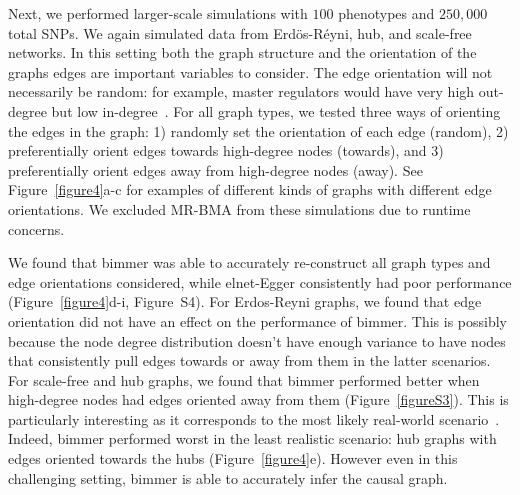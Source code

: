 \documentclass{article}
\begin{document}
Next, we performed larger-scale simulations with $100$ phenotypes and
$250,000$ total SNPs. We again
simulated data from Erd\"os-R\'eyni, hub, and scale-free networks. In this setting
both the graph structure and the orientation of the graphs edges are important
variables to consider. The edge orientation will not necessarily be random:
for example, master regulators would have very high out-degree but low in-degree~\cite{Liu2010}.
For all graph types, we tested three ways of orienting the edges in the graph:
 1) randomly set the orientation
of each edge (random), 2) preferentially orient edges towards high-degree nodes (towards),
 and 3) preferentially orient edges away from high-degree nodes (away). See
 Figure~\ref{figure4}a-c for examples of different kinds of graphs with
 different edge orientations. We excluded
MR-BMA from these simulations due to runtime concerns.

We found that bimmer was able to accurately re-construct all graph types and edge
orientations considered, while
elnet-Egger consistently had poor performance (Figure~\ref{figure4}d-i, Figure~S4).
 For Erdos-Reyni graphs, we found that edge orientation did not have an effect on the
 performance of bimmer. This is possibly because the node degree distribution
 doesn't have enough variance to have nodes that consistently pull edges towards
 or away from them in the latter scenarios. For scale-free and hub graphs, we
 found that bimmer performed better when high-degree nodes had edges oriented
 away from them (Figure~\ref{figureS3}). This is particularly interesting as
 it corresponds to the most likely real-world scenario~\cite{Barabasi1999}. Indeed, bimmer
 performed worst in the least realistic scenario: hub graphs with edges oriented
 towards the hubs (Figure~\ref{figure4}e). However even in this challenging setting, bimmer
 is able to accurately infer the causal graph.
\end{document}
